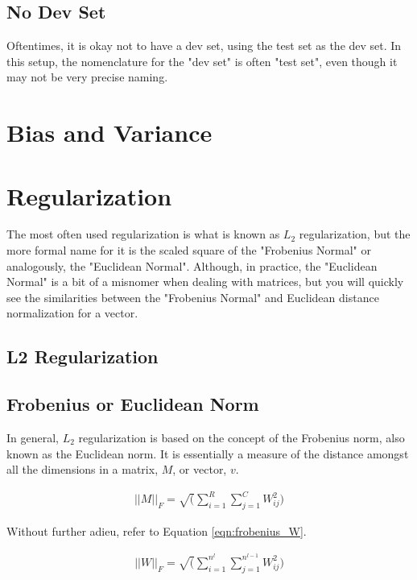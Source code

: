 \documentclass{article}
\begin{document}
\subsection{No Dev Set}

Oftentimes, it is okay not to have a dev set, using the test set as the dev set.  In this setup, the nomenclature for the "dev set" is often "test set", even though it may not be very precise naming.

\section{Bias and Variance}



\section{Regularization}

The most often used regularization is what is known as $L_{2}$ regularization, but the more formal name for it is the scaled square of the "Frobenius Normal" or analogously, the "Euclidean Normal".  Although, in practice, the "Euclidean Normal" is a bit of a misnomer when dealing with matrices, but you will quickly see the similarities between the "Frobenius Normal" and Euclidean distance normalization for a vector.

\subsection{L2 Regularization}

\subsection{Frobenius or Euclidean Norm}

In general, $L_2$ regularization is based on the concept of the Frobenius norm, also known as the Euclidean norm.  It is essentially a measure of the distance amongst all the dimensions in a matrix, $M$, or vector, $v$.

\begin{align} \label{eqn:frobenius}
||M||_{F} = \sqrt(\sum_{i=1}^{R} \sum_{j=1}^{C} W_{ij}^{2})
\end{align}

Without further adieu, refer to Equation \ref{eqn:frobenius_W}.

\begin{align} \label{eqn:frobenius_W}
||W||_{F} = \sqrt(\sum_{i=1}^{n^{l}} \sum_{j=1}^{n^{l-1}} W_{ij}^{2})
\end{align}
\end{document}
